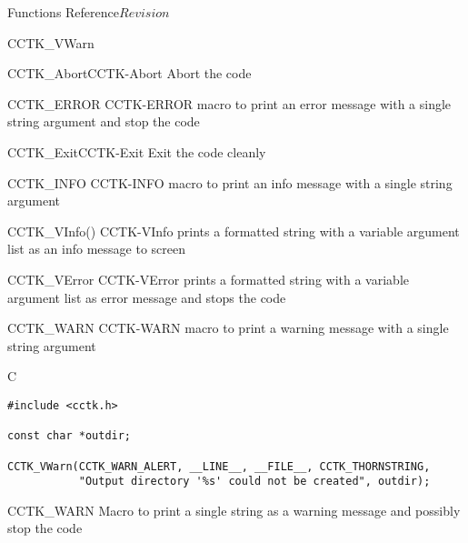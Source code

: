 \begin{cactuspart}{ Functions Reference}{}{$Revision$}
\begin{FunctionDescription}{CCTK\_VWarn}
\begin{SeeAlsoSection}
\begin{SeeAlso2}{CCTK\_Abort}{CCTK-Abort}
Abort the code
\end{SeeAlso2}
\begin{SeeAlso2} {CCTK\_ERROR} {CCTK-ERROR}
macro to print an error message with a single string argument and stop
the code
\end{SeeAlso2}
\begin{SeeAlso2}{CCTK\_Exit}{CCTK-Exit}
Exit the code cleanly
\end{SeeAlso2}
\begin{SeeAlso2} {CCTK\_INFO} {CCTK-INFO}
macro to print an info message with a single string argument
\end{SeeAlso2}
\begin{SeeAlso2} {CCTK\_VInfo()} {CCTK-VInfo}
prints a formatted string with a variable argument list as an info message to
screen
\end{SeeAlso2}
\begin{SeeAlso2} {CCTK\_VError} {CCTK-VError}
prints a formatted string with a variable argument list as error
message and stops the code
\end{SeeAlso2}
\begin{SeeAlso2} {CCTK\_WARN} {CCTK-WARN}
macro to print a warning message with a single string argument
\end{SeeAlso2}
\end{SeeAlsoSection}

\begin{ExampleSection}
\begin{Example}{C}
\begin{verbatim}
#include <cctk.h>

const char *outdir;

CCTK_VWarn(CCTK_WARN_ALERT, __LINE__, __FILE__, CCTK_THORNSTRING,
           "Output directory '%s' could not be created", outdir);
\end{verbatim}
\end{Example}
\end{ExampleSection}
\end{FunctionDescription}






\begin{FunctionDescription}{CCTK\_WARN}
\label{CCTK-WARN}
Macro to print a single string as a warning message and possibly stop the code


\end{FunctionDescription}
\end{cactuspart}
